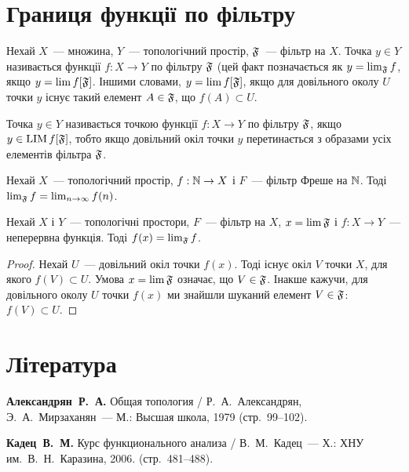 \section{Границя функції по фільтру}

\begin{definition}
    Нехай $X$~--- множина, $Y$~--- топологічний простір, $\frak F$~--- фільтр на $X$. Точка $y \in Y$ називається  функції $f: X \to Y$ по фільтру $\frak F$ (цей факт позначається як $y = \lim_{\frak F} f$, якщо $y = \lim f[\frak F]$. Іншими словами, $y = \lim f [\frak F]$, якщо для довільного околу $U$ точки $y$ існує такий елемент $A \in \frak F$, що $f(A) \subset U$.
\end{definition}

\begin{definition}
    Точка $y \in Y$ називається  точкою функції $f: X \to Y$ по фільтру $\frak F$, якщо $y \in \LIM f[\frak F]$, тобто якщо довільний окіл точки $y$ перетинається з образами усіх елементів фільтра $\frak F$.
\end{definition}

\begin{example}
    Нехай $X$~--- топологічний простір, $f: \NN \to X$ і $F$~--- фільтр Фреше на $\NN$. Тоді $\lim_{\frak F} f = \lim_{n \to \infty} f(n)$.
\end{example}

\begin{theorem}
    Нехай $X$ і $Y$~--- топологічні простори, $F$~--- фільтр на $X$, $x = \lim \frak F$ і $f: X \to Y$~--- неперервна функція. Тоді $f(x) = \lim_{\frak F} f$.
\end{theorem}

\begin{proof}
    Нехай $U$~--- довільний окіл точки $f(x)$. Тоді існує окіл $V$ точки $X$, для якого $f(V) \subset U$. Умова $x = \lim \frak F$ означає, що $V \in \frak F$. Інакше кажучи, для довільного околу $U$ точки $f(x)$ ми знайшли шуканий елемент $V \in \frak F$: $f(V) \subset U$.
\end{proof}

\section{Література}

\begin{enumerate}[label={[\arabic*]}]
\item \textbf{Александрян~Р.~А.}
Общая топология /
Р.~А.~Александрян, Э.~А.~Мирзаханян~---
М.: Высшая школа, 1979 (стр.~99--102).
\item \textbf{Кадец~В.~М.}
Курс функционального анализа /
В.~М.~Кадец~---
Х.: ХНУ им.~В.~Н.~Каразина, 2006. (стр.~481--488).
\end{enumerate}
